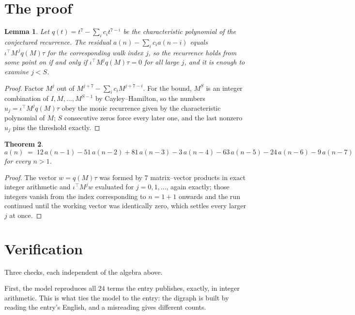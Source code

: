 \documentclass[11pt,a4paper]{article}
\theoremstyle{plain}
\newtheorem{theorem}{Theorem}
\newtheorem{lemma}[theorem]{Lemma}
\theoremstyle{definition}
\begin{document}
\section{The proof}

\begin{lemma}\label{lem:crit}
Let $q(t)=t^{7}-\sum_i c_it^{7-i}$ be the characteristic polynomial of the
conjectured recurrence. The residual $a(n)-\sum_ic_ia(n-i)$ equals
$\iota^{\!\top}M^{\,j}q(M)\tau$ for the corresponding walk index $j$, so the recurrence
holds from some point on if and only if $\iota^{\!\top}M^{j}q(M)\tau=0$ for all large $j$,
and it is enough to examine $j<S$.
\end{lemma}

\begin{proof}
Factor $M^{j}$ out of $M^{j+7}-\sum_ic_iM^{j+7-i}$. For the bound, $M^{S}$
is an integer combination of $I,M,\dots,M^{S-1}$ by Cayley--Hamilton, so the numbers
$u_j=\iota^{\!\top}M^{j}q(M)\tau$ obey the monic recurrence given by the characteristic
polynomial of $M$; $S$ consecutive zeros force every later one, and the last nonzero $u_j$
pins the threshold exactly.
\end{proof}

\begin{theorem}
\[
a(n)\;=\;12\,a(n-1) - 51\,a(n-2) + 81\,a(n-3) - 3\,a(n-4) - 63\,a(n-5) - 24\,a(n-6) - 9\,a(n-7)
\]
for every $n>1$.
\end{theorem}

\begin{proof}
The vector $w=q(M)\tau$ was formed by $7$ matrix--vector products in exact integer
arithmetic and $\iota^{\!\top}M^{j}w$ evaluated for $j=0,1,\dots$, again exactly; those
integers vanish from the index corresponding to $n=1+1$ onwards and the run continued
until the working vector was identically zero, which settles every larger $j$ at once.
\end{proof}

\section{Verification}

Three checks, each independent of the algebra above.

First, the model reproduces all $24$ terms the entry publishes, exactly, in integer
arithmetic. This is what ties the model to the entry: the digraph is built by reading the
entry's English, and a misreading gives different counts.
\end{document}
